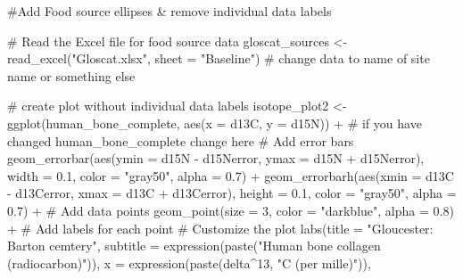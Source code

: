 \documentclass[
]{agujournal2019}
\newenvironment{Shaded}{\begin{snugshade}}{\end{snugshade}}
\newcommand{\AttributeTok}[1]{\textcolor[rgb]{0.40,0.45,0.13}{#1}}
\newcommand{\CommentTok}[1]{\textcolor[rgb]{0.37,0.37,0.37}{#1}}
\newcommand{\DecValTok}[1]{\textcolor[rgb]{0.68,0.00,0.00}{#1}}
\newcommand{\FloatTok}[1]{\textcolor[rgb]{0.68,0.00,0.00}{#1}}
\newcommand{\FunctionTok}[1]{\textcolor[rgb]{0.28,0.35,0.67}{#1}}
\newcommand{\NormalTok}[1]{\textcolor[rgb]{0.00,0.23,0.31}{#1}}
\newcommand{\OtherTok}[1]{\textcolor[rgb]{0.00,0.23,0.31}{#1}}
\newcommand{\SpecialCharTok}[1]{\textcolor[rgb]{0.37,0.37,0.37}{#1}}
\newcommand{\StringTok}[1]{\textcolor[rgb]{0.13,0.47,0.30}{#1}}
\begin{document}
\begin{Shaded}
\begin{Highlighting}[]
\CommentTok{\#Add Food source ellipses \& remove individual data labels}

\CommentTok{\# Read the Excel file for food source data}
\NormalTok{gloscat\_sources }\OtherTok{\textless{}{-}} \FunctionTok{read\_excel}\NormalTok{(}\StringTok{"Gloscat.xlsx"}\NormalTok{, }\AttributeTok{sheet =} \StringTok{"Baseline"}\NormalTok{) }\CommentTok{\# change data to name of site name or something else}

\CommentTok{\# create plot without individual data labels}
\NormalTok{isotope\_plot2 }\OtherTok{\textless{}{-}} \FunctionTok{ggplot}\NormalTok{(human\_bone\_complete, }\FunctionTok{aes}\NormalTok{(}\AttributeTok{x =}\NormalTok{ d13C, }\AttributeTok{y =}\NormalTok{ d15N)) }\SpecialCharTok{+} \CommentTok{\# if you have changed human\_bone\_complete change here}
  \CommentTok{\# Add error bars}
  \FunctionTok{geom\_errorbar}\NormalTok{(}\FunctionTok{aes}\NormalTok{(}\AttributeTok{ymin =}\NormalTok{ d15N }\SpecialCharTok{{-}}\NormalTok{ d15Nerror, }\AttributeTok{ymax =}\NormalTok{ d15N }\SpecialCharTok{+}\NormalTok{ d15Nerror), }
                \AttributeTok{width =} \FloatTok{0.1}\NormalTok{, }\AttributeTok{color =} \StringTok{"gray50"}\NormalTok{, }\AttributeTok{alpha =} \FloatTok{0.7}\NormalTok{) }\SpecialCharTok{+}
  \FunctionTok{geom\_errorbarh}\NormalTok{(}\FunctionTok{aes}\NormalTok{(}\AttributeTok{xmin =}\NormalTok{ d13C }\SpecialCharTok{{-}}\NormalTok{ d13Cerror, }\AttributeTok{xmax =}\NormalTok{ d13C }\SpecialCharTok{+}\NormalTok{ d13Cerror), }
                 \AttributeTok{height =} \FloatTok{0.1}\NormalTok{, }\AttributeTok{color =} \StringTok{"gray50"}\NormalTok{, }\AttributeTok{alpha =} \FloatTok{0.7}\NormalTok{) }\SpecialCharTok{+}
  \CommentTok{\# Add data points}
  \FunctionTok{geom\_point}\NormalTok{(}\AttributeTok{size =} \DecValTok{3}\NormalTok{, }\AttributeTok{color =} \StringTok{"darkblue"}\NormalTok{, }\AttributeTok{alpha =} \FloatTok{0.8}\NormalTok{) }\SpecialCharTok{+}
  \CommentTok{\# Add labels for each point}
  \CommentTok{\# Customize the plot}
  \FunctionTok{labs}\NormalTok{(}\AttributeTok{title =} \StringTok{"Gloucester: Barton cemtery"}\NormalTok{,}
       \AttributeTok{subtitle =} \FunctionTok{expression}\NormalTok{(}\FunctionTok{paste}\NormalTok{(}\StringTok{"Human bone collagen (radiocarbon)"}\NormalTok{)),}
       \AttributeTok{x =} \FunctionTok{expression}\NormalTok{(}\FunctionTok{paste}\NormalTok{(delta}\SpecialCharTok{\^{}}\DecValTok{13}\NormalTok{, }\StringTok{"C (per mille)"}\NormalTok{)),}

\end{Highlighting}
\end{Shaded}
\end{document}
